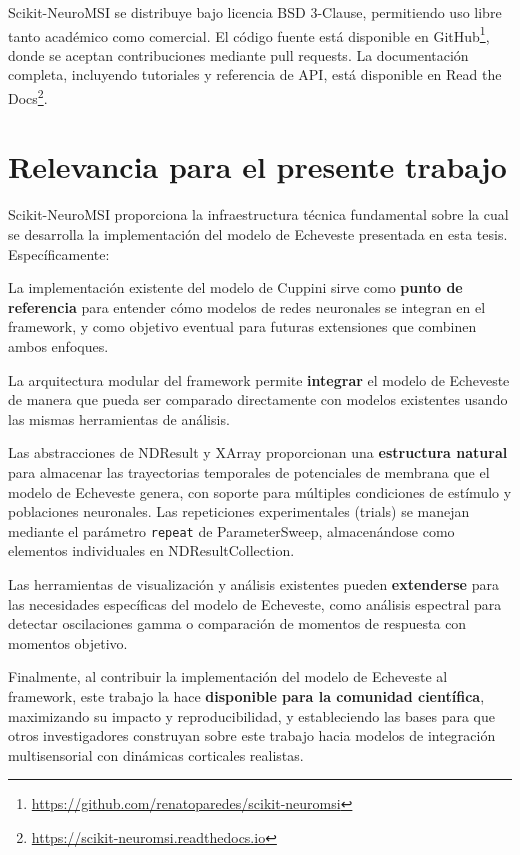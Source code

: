 Scikit-NeuroMSI se distribuye bajo licencia BSD 3-Clause, permitiendo uso libre tanto académico como comercial. El código fuente está disponible en GitHub\footnote{\url{https://github.com/renatoparedes/scikit-neuromsi}}, donde se aceptan contribuciones mediante pull requests. La documentación completa, incluyendo tutoriales y referencia de API, está disponible en Read the Docs\footnote{\url{https://scikit-neuromsi.readthedocs.io}}.


\section{Relevancia para el presente trabajo}
\label{sec:snmsi_relevancia}

Scikit-NeuroMSI proporciona la infraestructura técnica fundamental sobre la cual se desarrolla la implementación del modelo de Echeveste presentada en esta tesis. Específicamente:

La implementación existente del modelo de Cuppini sirve como \textbf{punto de referencia} para entender cómo modelos de redes neuronales se integran en el framework, y como objetivo eventual para futuras extensiones que combinen ambos enfoques.

La arquitectura modular del framework permite \textbf{integrar} el modelo de Echeveste de manera que pueda ser comparado directamente con modelos existentes usando las mismas herramientas de análisis.

Las abstracciones de NDResult y XArray proporcionan una \textbf{estructura natural} para almacenar las trayectorias temporales de potenciales de membrana que el modelo de Echeveste genera, con soporte para múltiples condiciones de estímulo y poblaciones neuronales. Las repeticiones experimentales (trials) se manejan mediante el parámetro \texttt{repeat} de ParameterSweep, almacenándose como elementos individuales en NDResultCollection.

Las herramientas de visualización y análisis existentes pueden \textbf{extenderse} para las necesidades específicas del modelo de Echeveste, como análisis espectral para detectar oscilaciones gamma o comparación de momentos de respuesta con momentos objetivo.

Finalmente, al contribuir la implementación del modelo de Echeveste al framework, este trabajo la hace \textbf{disponible para la comunidad científica}, maximizando su impacto y reproducibilidad, y estableciendo las bases para que otros investigadores construyan sobre este trabajo hacia modelos de integración multisensorial con dinámicas corticales realistas.
